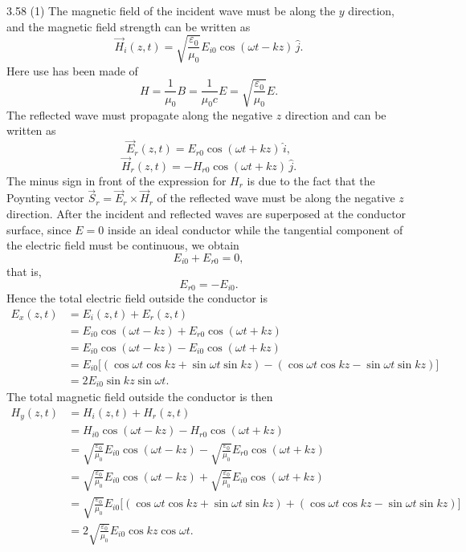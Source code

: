 \begin{solution}{3.58}
(1) The magnetic field of the incident wave must be along the $y$ direction, and the magnetic field strength can be written as
\[
\vec{H}_i(z,t)=\sqrt{\frac{\varepsilon_0}{\mu_0}}E_{i0}\cos(\omega t-kz)\,\hat{j}.
\]
Here use has been made of
\[
H=\frac{1}{\mu_0}B=\frac{1}{\mu_0c}E=\sqrt{\frac{\varepsilon_0}{\mu_0}}E.
\]
The reflected wave must propagate along the negative $z$ direction and can be written as
\[
\vec{E}_r(z,t)=E_{r0}\cos(\omega t+kz)\,\hat{i},
\]
\[
\vec{H}_r(z,t)=-H_{r0}\cos(\omega t+kz)\,\hat{j}.
\]
The minus sign in front of the expression for $H_r$ is due to the fact that the Poynting vector $\vec{S}_r=\vec{E}_r\times\vec{H}_r$ of the reflected wave must be along the negative $z$ direction. After the incident and reflected waves are superposed at the conductor surface, since $E=0$ inside an ideal conductor while the tangential component of the electric field must be continuous, we obtain
\[
E_{i0}+E_{r0}=0,
\]
that is,
\[
E_{r0}=-E_{i0}.
\]
Hence the total electric field outside the conductor is
\begin{align*}
E_x(z,t)&=E_i(z,t)+E_r(z,t)\\
&=E_{i0}\cos(\omega t-kz)+E_{r0}\cos(\omega t+kz)\\
&=E_{i0}\cos(\omega t-kz)-E_{i0}\cos(\omega t+kz)\\
&=E_{i0}\bigl[(\cos\omega t\cos kz+\sin\omega t\sin kz)-(\cos\omega t\cos kz-\sin\omega t\sin kz)\bigr]\\
&=2E_{i0}\sin kz\sin\omega t.
\end{align*}
The total magnetic field outside the conductor is then
\begin{align*}
H_y(z,t)&=H_i(z,t)+H_r(z,t)\\
&=H_{i0}\cos(\omega t-kz)-H_{r0}\cos(\omega t+kz)\\
&=\sqrt{\frac{\varepsilon_0}{\mu_0}}E_{i0}\cos(\omega t-kz)-\sqrt{\frac{\varepsilon_0}{\mu_0}}E_{r0}\cos(\omega t+kz)\\
&=\sqrt{\frac{\varepsilon_0}{\mu_0}}E_{i0}\cos(\omega t-kz)+\sqrt{\frac{\varepsilon_0}{\mu_0}}E_{i0}\cos(\omega t+kz)\\
&=\sqrt{\frac{\varepsilon_0}{\mu_0}}E_{i0}\bigl[(\cos\omega t\cos kz+\sin\omega t\sin kz)+(\cos\omega t\cos kz-\sin\omega t\sin kz)\bigr]\\
&=2\sqrt{\frac{\varepsilon_0}{\mu_0}}E_{i0}\cos kz\cos\omega t.
\end{align*}


\end{solution}
